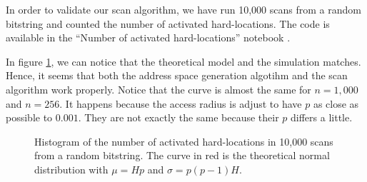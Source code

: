In order to validate our scan algorithm, we have run 10,000 scans from a random bitstring and counted the number of activated hard-locations. The code is available in the ``Number of activated hard-locations'' notebook \citep{sdmframework}.

In figure \ref{fig:validation-activated-hls}, we can notice that the theoretical model and the simulation matches. Hence, it seems that both the address space generation algotihm and the scan algorithm work properly. Notice that the curve is almost the same for $n=1,000$ and $n=256$. It happens because the access radius is adjust to have $p$ as close as possible to $0.001$. They are not exactly the same because their $p$ differs a little.

\begin{figure}[!htb]
  \centering

  \caption{Histogram of the number of activated hard-locations in 10,000 scans from a random bitstring. The curve in red is the theoretical normal distribution with $\mu = Hp$ and $\sigma = p(p-1)H$.}
  \label{fig:validation-activated-hls}
\end{figure}

